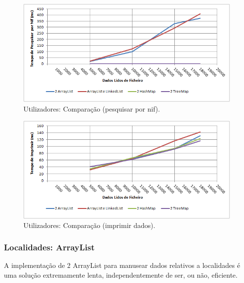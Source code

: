 \documentclass[a5paper,twocolumn, 11pt]{article}
\begin{document}
\begin{figure}[h!b!t!]
    \caption[Utilizadores: Comparação (pesquisar por nif)]{Utilizadores: Comparação (pesquisar por nif).}
    \label{hashtable}
    \centering
        \includegraphics[width=400pt]{cusers_o4.png}
\end{figure}
\begin{figure}[h!b!t!]
    \caption[Utilizadores: Comparação (imprimir dados)]{Utilizadores: Comparação (imprimir dados).}
    \label{hashtable}
    \centering
        \includegraphics[width=400pt]{cusers_o5.png}
\end{figure}

\twocolumn
\newpage














\subsubsection{Localidades: ArrayList}
A implementação de 2 ArrayList para manusear dados relativos a localidades é uma solução extremamente lenta, independentemente de ser, ou não, eficiente.
\end{document}

